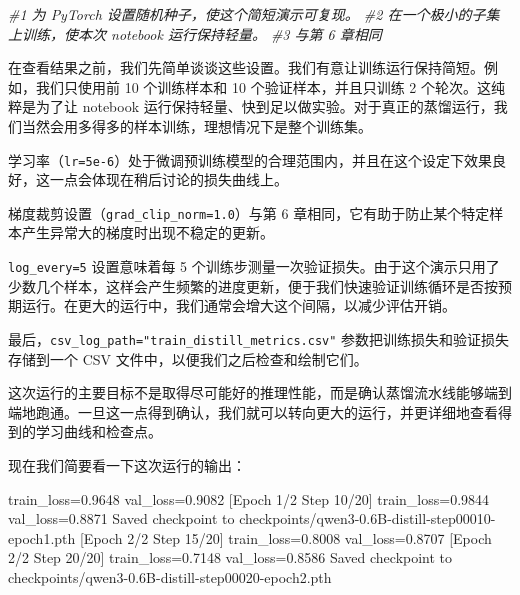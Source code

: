 {\noindent\small\textit{\#1 为 PyTorch 设置随机种子，使这个简短演示可复现。 \newline \#2 在一个极小的子集上训练，使本次 notebook 运行保持轻量。 \newline \#3 与第 6 章相同}\par}

在查看结果之前，我们先简单谈谈这些设置。我们有意让训练运行保持简短。例如，我们只使用前 10 个训练样本和 10 个验证样本，并且只训练 2 个轮次。这纯粹是为了让 notebook 运行保持轻量、快到足以做实验。对于真正的蒸馏运行，我们当然会用多得多的样本训练，理想情况下是整个训练集。

学习率（\texttt{lr=5e-6}）处于微调预训练模型的合理范围内，并且在这个设定下效果良好，这一点会体现在稍后讨论的损失曲线上。

梯度裁剪设置（\texttt{grad\_clip\_norm=1.0}）与第 6 章相同，它有助于防止某个特定样本产生异常大的梯度时出现不稳定的更新。

\texttt{log\_every=5} 设置意味着每 5 个训练步测量一次验证损失。由于这个演示只用了少数几个样本，这样会产生频繁的进度更新，便于我们快速验证训练循环是否按预期运行。在更大的运行中，我们通常会增大这个间隔，以减少评估开销。

最后，\texttt{csv\_log\_path=}\texttt{"}\texttt{train\_distill\_metrics.csv}\texttt{"} 参数把训练损失和验证损失存储到一个 CSV 文件中，以便我们之后检查和绘制它们。

这次运行的主要目标不是取得尽可能好的推理性能，而是确认蒸馏流水线能够端到端地跑通。一旦这一点得到确认，我们就可以转向更大的运行，并更详细地查看得到的学习曲线和检查点。

现在我们简要看一下这次运行的输出：

\begin{codebox}
 train_loss=0.9648 val_loss=0.9082
[Epoch 1/2 Step 10/20] train_loss=0.9844 val_loss=0.8871
Saved checkpoint to checkpoints/qwen3-0.6B-distill-step00010-epoch1.pth
[Epoch 2/2 Step 15/20] train_loss=0.8008 val_loss=0.8707
[Epoch 2/2 Step 20/20] train_loss=0.7148 val_loss=0.8586
Saved checkpoint to checkpoints/qwen3-0.6B-distill-step00020-epoch2.pth
\end{codebox}


